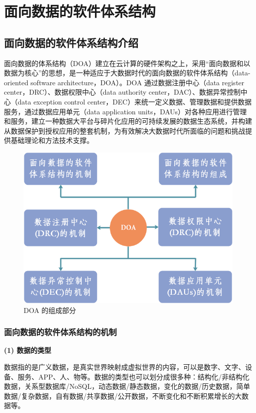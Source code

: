 \documentclass[article]{BJTU-thesis}
\begin{document}
	\section{面向数据的软件体系结构}
	\subsection{面向数据的软件体系结构介绍}
	面向数据的体系结构（DOA）建立在云计算的硬件架构之上，采用“面向数据和以数据为核心”的思想，是一种适应于大数据时代的面向数据的软件体系结构（data- oriented software architecture，DOA）。DOA 通过数据注册中心（data register center，DRC）、数据权限中心（data authority center，DAC）、数据异常控制中心（data exception control center，DEC）来统一定义数据、管理数据和提供数据服务，通过数据应用单元（data
	application units，DAUs）对各种应用进行管理和服务，建立一种数据大平台与碎片化应用的可持续发展的数据生态系统，并构建从数据保护到授权应用的整套机制，为有效解决大数据时代所面临的问题和挑战提供基础理论和方法技术支撑。
	
	\begin{figure}[!htbp]
		\centering
		\includegraphics[scale=0.6]{1.png}
		\caption{DOA 的组成部分}
		\label{fig:fig1}
	\end{figure}
	
	\subsubsection{面向数据的软件体系结构的机制}
	\noindent\textbf{(1) 数据的类型}
	
	数据指的是广义数据，是真实世界映射成虚拟世界的内容，可以是数字、文字、设备、服务、APP、人、物等。数据的类型也可以划分成很多种：结构化/非结构化数据，关系型数据库/NoSQL，动态数据/静态数据，变化的数据/历史数据，简单数据/复杂数据，自有数据/共享数据/公开数据，不断变化和不断积累增长的大数据等。
	\newline
	
\end{document}
